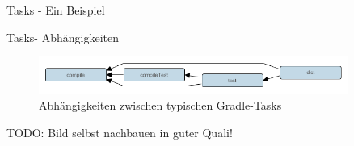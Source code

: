 \documentclass[newPxFont,numfooter,sectionpages,notes]{beamer}
\begin{document}
\begin{frame}{Tasks - Ein Beispiel}

\end{frame}

\begin{frame}{Tasks- Abhängigkeiten}
\vfill
\begin{figure}
	\centering
	\includegraphics[width=0.9\textwidth]{pics/task_dependencies}
	\caption{Abhängigkeiten zwischen typischen Gradle-Tasks}
	
\end{figure}
TODO: Bild selbst nachbauen in guter Quali!
\vfill
\end{frame}
\end{document}
